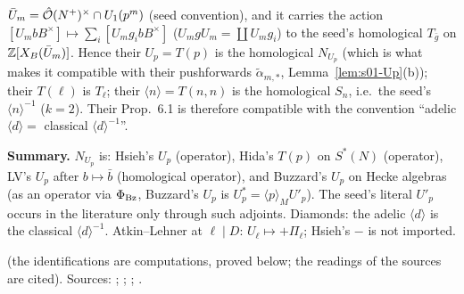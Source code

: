 \begin{lemma}
\begin{enumerate}[label=(\alph*)]
  $\bar U_m=\hat{\mathcal{O}}(N^+)^\times\cap U_1(p^m)$ (seed convention), and it carries the action $[U_mbB^\times]\mapsto\sum_i[U_mg_ibB^\times]$
  ($U_mgU_m=\coprod U_mg_i$) to the seed's homological $T_{\bar g}$ on $\mathbb{Z}[X_B(\bar U_m)]$. Hence their $U_p=T(p)$ is the homological $N_{U_p}$
  (which is what makes it compatible with their pushforwards $\tilde\alpha_{m,*}$, Lemma~\ref{lem:s01-Up}(b)); their $T(\ell)$ is $T_\ell$; their
  $\langle n\rangle=T(n,n)$ is the homological $S_n$, i.e.\ the seed's $\langle n\rangle^{-1}$ ($k=2$). Their Prop.~6.1 is therefore compatible with the
  convention ``adelic $\langle d\rangle=$ classical $\langle d\rangle^{-1}$''.
\end{enumerate}
\textbf{Summary.} $N_{U_p}$ is: Hsieh's $U_p$ (operator), Hida's $T(p)$ on $S^*(N)$ (operator), LV's $U_p$ after $b\mapsto\bar b$ (homological
operator), and Buzzard's $U_p$ on Hecke algebras (as an operator via $\Phi_{\rm Bz}$, Buzzard's $U_p$ is $U_p^*=\langle p\rangle_MU'_p$). The seed's
literal $U'_p$ occurs in the literature only through such adjoints. Diamonds: the adelic $\langle d\rangle$ is the classical $\langle d\rangle^{-1}$.
Atkin--Lehner at $\ell\mid D$: $U_\ell\mapsto+\Pi_\ell$; Hsieh's $-$ is not imported.
\end{lemma}
\noindent\stpmc{} (the identifications are computations, proved below; the readings of the sources are cited). Sources:
\stcited{} ;
\stcited{} ;
\stcited{} ;
\stcited{} .
